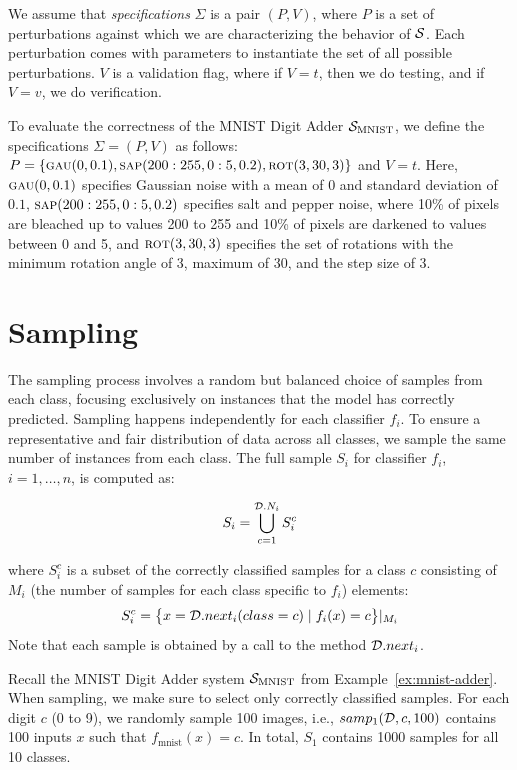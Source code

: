 We assume that \emph{specifications} $\Sigma$ is a pair $(P, V)$, where $P$ is a set of perturbations against which we are characterizing the behavior of $\S$. Each perturbation comes with parameters to instantiate the set of all possible perturbations. $V$ is a validation flag, where if $V=t$, then we do testing, and if $V=v$, we do verification.

\begin{example}
To evaluate the correctness of the MNIST Digit Adder $\S_{\text{MNIST}}$, we define the specifications $\Sigma = (P, V)$ as follows: $P = \{\gaussian(0,0.1), \saltpepper(200:255, 0:5, 0.2), \rotation(3,30,3)\}$ and $V=t$. Here, $\gaussian(0,0.1)$ specifies Gaussian noise with a mean of $0$ and standard deviation of $0.1$, $\saltpepper(200:255,0:5,0.2)$ specifies salt and pepper noise, where 10\% of pixels are bleached up to values 200 to 255 and 10\% of pixels are darkened to values between 0 and 5, and $\rotation(3,30,3)$ specifies the set of rotations with the minimum rotation angle of 3, maximum of 30, and the step size of 3.
\end{example}

\section{Sampling}

The sampling process involves a random but balanced choice of samples from each class, focusing exclusively on instances that the model has correctly predicted. Sampling happens independently for each classifier $f_i$. To ensure a representative and fair distribution of data across all classes, we sample the same number of instances from each class. The full sample $S_i$ for classifier $f_i$, $i=1,\dots,n$, is computed as:

\begin{equation}
S_i = \bigcup_{c=1}^{\D.N_i} S_i^c
\end{equation}

where $S_i^c$ is a subset of the correctly classified samples for a class $c$ consisting of $M_i$ (the number of samples for each class specific to $f_i$) elements:
\[S_i^c = \big\{x = \D.next_i(class=c)\mid f_i(x)=c\big\}|_{M_i}\] 
Note that each sample is obtained by a call to the method $\D.next_i$.

\begin{example}
Recall the MNIST Digit Adder system $\S_{\text{MNIST}}$ from Example~\ref{ex:mnist-adder}. When sampling, we make sure to select only correctly classified samples. For each digit $c$ (0 to 9), we randomly sample 100 images, i.e., $samp_1(\D,c,100)$ contains 100 inputs $x$ such that $f_{\text{mnist}}(x) = c$. In total, $S_1$ contains 1000 samples for all 10 classes.
\end{example}


